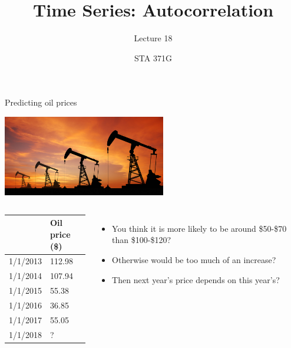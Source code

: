 \documentclass{beamer}\usepackage[]{graphicx}\usepackage[]{color}
\title{Time Series: Autocorrelation}
\subtitle{Lecture 18}
\author{STA 371G}
\begin{document}
  
  

  \frame{\maketitle}



  \begin{darkframes}
    
    \begin{frame}{Predicting oil prices}
      \fontsize{8}{8}\selectfont
      \begin{center}
        \includegraphics[width=2.8in]{pumpjack} \\
      \end{center} 
      
      
      \begin{columns}[onlytextwidth]
            \begin{center}
              \begin{tabular}{ll}
              \hline
                 & Oil price (\$) \\
              \hline
              1/1/2013 & 112.98  \\
              1/1/2014 & 107.94 \\
              1/1/2015 & 55.38 \\
              1/1/2016 & 36.85 \\
              1/1/2017 & 55.05 \\
              1/1/2018 & ? \\
              \hline 
            \end{tabular}
          \end{center} \pause
              
          \begin{itemize}
            \item You think it is more likely to be around \$50-\$70 than \$100-\$120? \pause
            \item Otherwise would be too much of an increase?  \pause
            \item Then next year's price depends on this year's?  \pause
          \end{itemize}
      \end{columns}
    \end{frame}
    

\end{darkframes}
\end{document}
